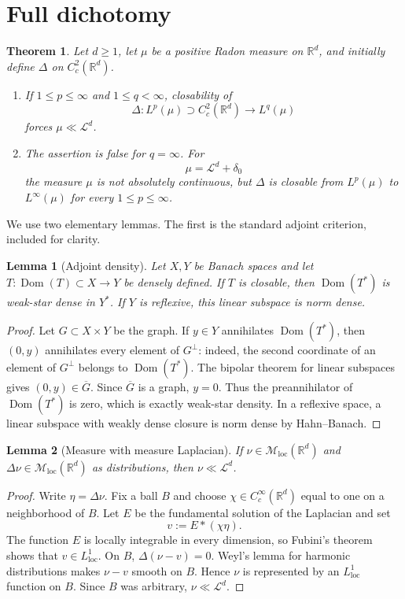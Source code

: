 \documentclass[11pt]{article}
\newtheorem{theorem}{Theorem}
\newtheorem{lemma}{Lemma}
\newcommand{\R}{\mathbb R}
\newcommand{\Leb}{\mathcal L}
\newcommand{\Mloc}{\mathcal M_{\mathrm{loc}}}
\newcommand{\Dom}{\operatorname{Dom}}
\begin{document}
\section{Full dichotomy}

\begin{theorem}\label{thm:main}
Let $d\ge1$, let $\mu$ be a positive Radon measure on $\R^d$, and initially
define $\Delta$ on $C_c^2(\R^d)$.
\begin{enumerate}
\item If $1\le p\le\infty$ and $1\le q<\infty$, closability of
\[
 \Delta:L^p(\mu)\supset C_c^2(\R^d)\longrightarrow L^q(\mu)
\]
forces $\mu\ll\Leb^d$.
\item The assertion is false for $q=\infty$.  For
\[
 \mu=\Leb^d+\delta_0
\]
the measure $\mu$ is not absolutely continuous, but $\Delta$ is closable from
$L^p(\mu)$ to $L^\infty(\mu)$ for every $1\le p\le\infty$.
\end{enumerate}
\end{theorem}

We use two elementary lemmas.  The first is the standard adjoint criterion,
included for clarity.

\begin{lemma}[Adjoint density]\label{lem:adjoint}
Let $X,Y$ be Banach spaces and let $T:\Dom(T)\subset X\to Y$ be densely
defined.  If $T$ is closable, then $\Dom(T^*)$ is weak-star dense in $Y^*$.
If $Y$ is reflexive, this linear subspace is norm dense.
\end{lemma}

\begin{proof}
Let $G\subset X\times Y$ be the graph.  If $y\in Y$ annihilates
$\Dom(T^*)$, then $(0,y)$ annihilates every element of $G^\perp$: indeed,
the second coordinate of an element of $G^\perp$ belongs to $\Dom(T^*)$.
The bipolar theorem for linear subspaces gives $(0,y)\in\overline G$.
Since $\overline G$ is a graph, $y=0$.  Thus the preannihilator of
$\Dom(T^*)$ is zero, which is exactly weak-star density.  In a reflexive
space, a linear subspace with weakly dense closure is norm dense by
Hahn--Banach.
\end{proof}

\begin{lemma}[Measure with measure Laplacian]\label{lem:elliptic}
If $\nu\in\Mloc(\R^d)$ and $\Delta\nu\in\Mloc(\R^d)$ as distributions, then
$\nu\ll\Leb^d$.
\end{lemma}

\begin{proof}
Write $\eta=\Delta\nu$.  Fix a ball $B$ and choose
$\chi\in C_c^\infty(\R^d)$ equal to one on a neighborhood of $B$.  Let $E$
be the fundamental solution of the Laplacian and set
\[
 v:=E*(\chi\eta).
\]
The function $E$ is locally integrable in every dimension, so Fubini's theorem
shows that $v\in L^1_{\mathrm{loc}}$.  On $B$,
$\Delta(\nu-v)=0$.  Weyl's lemma for harmonic distributions makes
$\nu-v$ smooth on $B$.  Hence $\nu$ is represented by an $L^1_{\mathrm{loc}}$
function on $B$.  Since $B$ was arbitrary, $\nu\ll\Leb^d$.
\end{proof}
\end{document}
